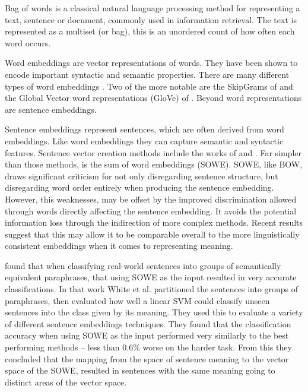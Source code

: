 {Bag of words is a classical natural language processing method for representing a text, sentence or document, commonly used in information retrieval. The text is represented as a multiset (or bag), this is an unordered count of how often each word occurs.

Word embeddings are vector representations of words. They have been shown to encode important syntactic and semantic properties. There are many different types of word embeddings \parencite{Yin2015}. Two of the more notable are the SkipGrams of \textcite{mikolov2013efficient,mikolov2013linguisticsubstructures} and the Global Vector word representations (GloVe) of \textcite{pennington2014glove}. Beyond word representations are sentence embeddings. 

Sentence embeddings represent sentences, which are often derived from word embeddings. Like word embeddings they can capture semantic and syntactic features. Sentence vector creation methods include the works of \textcite{le2014distributed} and \textcite{socher2014recursive}. Far simpler than those methods, is the  sum of word embeddings (SOWE). SOWE, like BOW, draws significant criticism for not only disregarding sentence structure, but disregarding word order entirely when producing the sentence embedding. However, this weaknesses, may be offset by the improved discrimination allowed through words directly affecting the sentence embedding. It avoids the potential information loss through the indirection of more complex methods. Recent results suggest that this may allow it to be comparable overall to the more linguistically consistent embeddings when it comes to representing meaning. 


\textcite{White2015SentVecMeaning} found that when classifying real-world sentences into groups of semantically equivalent paraphrases, that using SOWE as the input resulted in very accurate classifications. In that work White et al. partitioned the sentences into groups of paraphrases, then evaluated how well a linear SVM could classify unseen sentences into the class given by its meaning. They used this to evaluate a  variety of different sentence embeddings techniques. They found that the classification accuracy when using SOWE as the input performed very similarly to the best performing methods -- less than 0.6\% worse on the harder task. From this they concluded that the mapping from the space of sentence meaning to the vector space of the SOWE, resulted in sentences with the same meaning going to distinct areas of the vector space.

}
